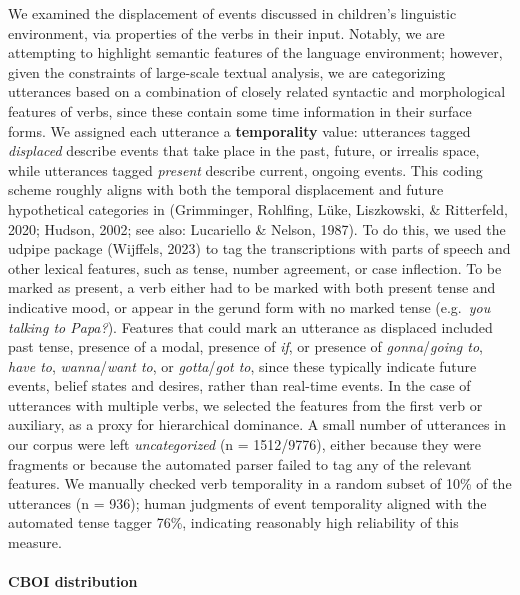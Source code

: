 \documentclass[
  man,floatsintext]{apa6}
\let\oldparagraph\paragraph
\renewcommand{\paragraph}[1]{\oldparagraph{#1}\mbox{}}
\begin{document}
We examined the displacement of events discussed in children's linguistic environment, via properties of the verbs in their input. Notably, we are attempting to highlight semantic features of the language environment; however, given the constraints of large-scale textual analysis, we are categorizing utterances based on a combination of closely related syntactic and morphological features of verbs, since these contain some time information in their surface forms. We assigned each utterance a \textbf{temporality} value: utterances tagged \emph{displaced} describe events that take place in the past, future, or irrealis space, while utterances tagged \emph{present} describe current, ongoing events. This coding scheme roughly aligns with both the temporal displacement and future hypothetical categories in (Grimminger, Rohlfing, Lüke, Liszkowski, \& Ritterfeld, 2020; Hudson, 2002; see also: Lucariello \& Nelson, 1987). To do this, we used the udpipe package (Wijffels, 2023) to tag the transcriptions with parts of speech and other lexical features, such as tense, number agreement, or case inflection. To be marked as present, a verb either had to be marked with both present tense and indicative mood, or appear in the gerund form with no marked tense (e.g.~\emph{you talking to Papa?}). Features that could mark an utterance as displaced included past tense, presence of a modal, presence of \emph{if}, or presence of \emph{gonna}/\emph{going to}, \emph{have to}, \emph{wanna}/\emph{want to}, or \emph{gotta}/\emph{got to}, since these typically indicate future events, belief states and desires, rather than real-time events. In the case of utterances with multiple verbs, we selected the features from the first verb or auxiliary, as a proxy for hierarchical dominance. A small number of utterances in our corpus were left \emph{uncategorized} (n = 1512/9776), either because they were fragments or because the automated parser failed to tag any of the relevant features. We manually checked verb temporality in a random subset of 10\% of the utterances (n = 936); human judgments of event temporality aligned with the automated tense tagger 76\%, indicating reasonably high reliability of this measure.

\hypertarget{cboi-distribution}{%
\paragraph{CBOI distribution}\label{cboi-distribution}}
\end{document}
